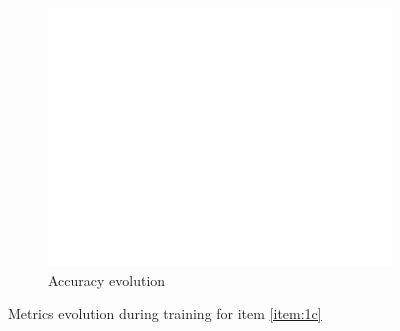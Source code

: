 \documentclass[10pt, a4paper]{article}
\begin{document}
\begin{figure}[htpb]
\begin{subfigure}[b]{0.32\textwidth}
      \centering
      \includegraphics[width=\textwidth]{images/Patch128_imagenet_acc.pdf}
      \caption{Accuracy evolution}
      \label{fig:q1c_acc}
  \end{subfigure}
  \caption{Metrics evolution during training for item \ref{item:1c}}
  \label{fig:q1c_metrics}
\end{figure}
\end{document}
